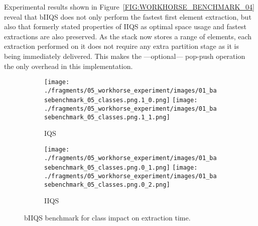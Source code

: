 Experimental results shown in Figure~\ref{FIG:WORKHORSE_BENCHMARK_04} reveal that bIIQS does not only perform the fastest first element extraction, but also that formerly stated properties of IIQS as optimal space usage and fastest extractions are also preserved. As the stack now stores a range of elements, each extraction performed on it does not require any extra partition stage as it is being immediately delivered. This makes the ---optional--- pop-push operation the only overhead in this implementation.\\

\begin{figure}
    \centering
    \begin{subfigure}[b]{\textwidth}
        \centering
        \texttt{[image: ./fragments/05\_workhorse\_experiment/images/01\_basebenchmark\_05\_classes.png.1\_0.png]}
        \texttt{[image: ./fragments/05\_workhorse\_experiment/images/01\_basebenchmark\_05\_classes.png.1\_1.png]}
        \caption{IQS}
        \label{FIG:WORKHORSE_BENCHMARK_05_NOISE__0_0}
    \end{subfigure}

    \begin{subfigure}[b]{\textwidth}
        \centering
        \texttt{[image: ./fragments/05\_workhorse\_experiment/images/01\_basebenchmark\_05\_classes.png.0\_1.png]}
        \texttt{[image: ./fragments/05\_workhorse\_experiment/images/01\_basebenchmark\_05\_classes.png.0\_2.png]}
        \caption{IIQS}
        \label{FIG:WORKHORSE_BENCHMARK_05_NOISE__0_1}
    \end{subfigure}

    \caption{bIIQS benchmark for class impact on extraction time.}
    \label{FIG:WORKHORSE_BENCHMARK_05_NOISE}
\end{figure}


